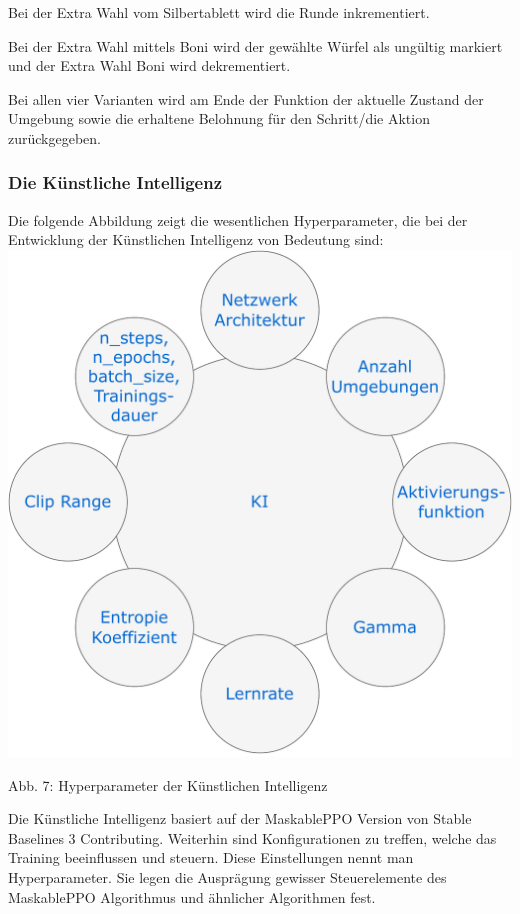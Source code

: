 Bei der Extra Wahl vom Silbertablett wird die Runde inkrementiert.

Bei der Extra Wahl mittels Boni wird der gewählte Würfel als ungültig markiert und der Extra Wahl Boni wird dekrementiert.

Bei allen vier Varianten wird am Ende der Funktion der aktuelle Zustand der Umgebung sowie die erhaltene Belohnung für den Schritt/die Aktion zurückgegeben.

\begin{minipage}{\linewidth}
	
\subsubsection{Die Künstliche Intelligenz}
Die folgende Abbildung zeigt die wesentlichen Hyperparameter, die bei der Entwicklung der Künstlichen Intelligenz von Bedeutung sind:\\

	\vspace{0.5cm}
	\includegraphics[width=1\textwidth]{Bilder/KI}
	
	Abb. 7: Hyperparameter der Künstlichen Intelligenz \\
\end{minipage}

Die Künstliche Intelligenz basiert auf der MaskablePPO Version von Stable Baselines 3 Contributing. Weiterhin sind Konfigurationen zu treffen, welche das Training beeinflussen und steuern. Diese Einstellungen nennt man Hyperparameter. Sie legen die Ausprägung gewisser Steuerelemente des MaskablePPO Algorithmus und ähnlicher Algorithmen fest.

